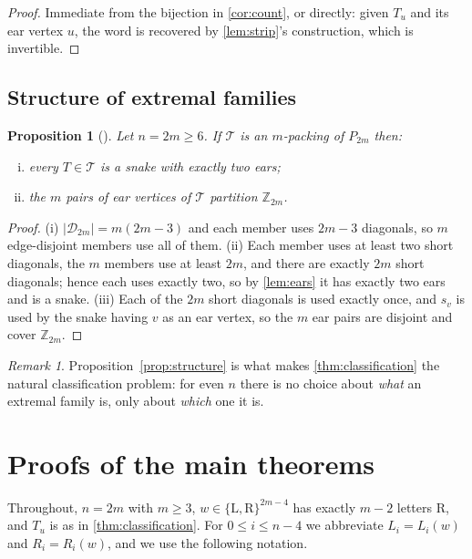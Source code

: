 \documentclass[11pt,a4paper]{article}
\newtheorem{proposition}[theorem]{Proposition}
\theoremstyle{definition}
\theoremstyle{remark}
\newtheorem{remark}[theorem]{Remark}
\newcommand{\diags}{\ensuremath{\mathcal{D}}}
\newcommand{\Zd}{\ensuremath{\mathbb{Z}}}
\newcommand{\Li}{\mathrm{L}}
\newcommand{\Ri}{\mathrm{R}}
\begin{document}
\begin{proof}
Immediate from the bijection in \cref{cor:count}, or directly: given $T_u$ and its ear
vertex $u$, the word is recovered by \cref{lem:strip}'s construction, which is invertible.
\end{proof}

\subsection{Structure of extremal families}

\begin{proposition}[\label{prop:structure}]
Let $n=2m\ge6$.  If $\mathcal{T}$ is an $m$-packing of $P_{2m}$ then:
\begin{enumerate}[(i)] $\bigcup_{T\in\mathcal{T}}T=\diags_{2m}$, i.e.\ $\mathcal{T}$ is a
resolution;
\item every $T\in\mathcal{T}$ is a snake with exactly two ears;
\item the $m$ pairs of ear vertices of $\mathcal{T}$ partition $\Zd_{2m}$.
\end{enumerate}
\end{proposition}

\begin{proof}
(i) $|\diags_{2m}|=m(2m-3)$ and each member uses $2m-3$ diagonals, so $m$ edge-disjoint members
use all of them.  (ii) Each member uses at least two short diagonals, the $m$ members use at
least $2m$, and there are exactly $2m$ short diagonals; hence each uses exactly two, so by
\cref{lem:ears} it has exactly two ears and is a snake.  (iii) Each of the $2m$ short
diagonals is used exactly once, and $s_v$ is used by the snake having $v$ as an ear
vertex, so the $m$ ear pairs are disjoint and cover $\Zd_{2m}$.
\end{proof}

\begin{remark}
Proposition~\ref{prop:structure} is what makes \cref{thm:classification} the natural
classification problem: for even $n$ there is no choice about \emph{what} an extremal
family is, only about \emph{which} one it is.
\end{remark}

\section{Proofs of the main theorems}\label{sec:proofs}

Throughout, $n=2m$ with $m\ge3$, $w\in\{\Li,\Ri\}^{2m-4}$ has exactly $m-2$ letters
$\Ri$, and $T_u$ is as in \cref{thm:classification}.  For $0\le i\le n-4$ we abbreviate
$L_i=L_i(w)$ and $R_i=R_i(w)$, and we use the following notation.
\end{document}
